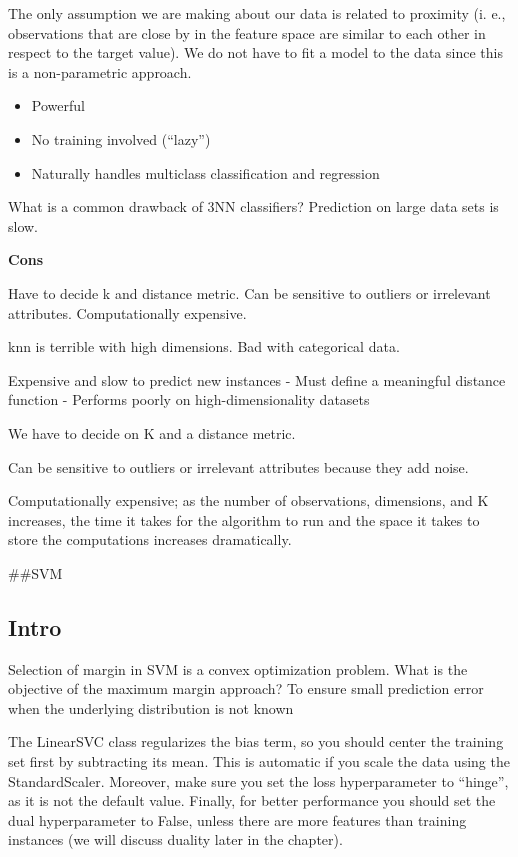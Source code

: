 \documentclass[]{book}
\providecommand{\tightlist}{%
  \setlength{\itemsep}{0pt}\setlength{\parskip}{0pt}}
\begin{document}
The only assumption we are making about our data is related to proximity (i.
e., observations that are close by in the feature space are similar to each
other in respect to the target value).
We do not have to fit a model to the data since this is a non-parametric
approach.

\begin{itemize}
\tightlist
\item
  Powerful
\item
  No training involved (``lazy'')
\item
  Naturally handles multiclass classification and regression
\end{itemize}

What is a common drawback of 3NN classifiers? Prediction on large data sets is slow.

\textbf{Cons}

Have to decide k and distance metric. Can be sensitive to outliers or irrelevant attributes. Computationally expensive.

knn is terrible with high dimensions. Bad with categorical data.

Expensive and slow to predict new instances
- Must define a meaningful distance function
- Performs poorly on high-dimensionality datasets

We have to decide on K and a distance metric.

Can be sensitive to outliers or irrelevant attributes because they add noise.

Computationally expensive; as the number of observations, dimensions, and K increases, the time it takes for the algorithm to run and the space it takes to store the computations increases dramatically.

\#\#SVM

\hypertarget{intro-4}{%
\subsection{Intro}\label{intro-4}}

Selection of margin in SVM is a convex optimization problem. What is the objective of the maximum margin approach? To ensure small prediction error when the underlying distribution is not known

The LinearSVC class regularizes the bias term, so you should center the training set first by subtracting its mean. This is automatic if you scale the data using the StandardScaler. Moreover, make sure you set the loss hyperparameter to ``hinge'', as it is not the default value. Finally, for better performance you should set the dual hyperparameter to False, unless there are more features than training instances (we will discuss duality later in the chapter).
\end{document}
